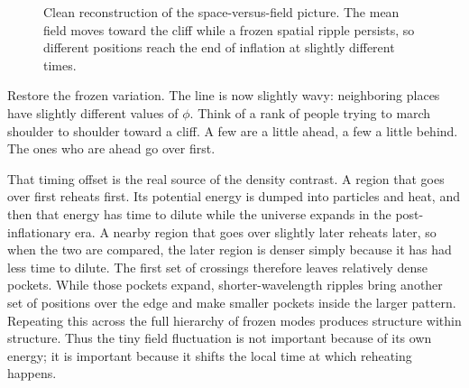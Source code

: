 \begin{figure}[htbp]
\centering
\begin{coursefitfigure}
\end{coursefitfigure}
\caption{Clean reconstruction of the space-versus-field picture. The mean field moves toward the cliff while a frozen spatial ripple persists, so different positions reach the end of inflation at slightly different times.}
\label{fig:c10-cliff-reconstruction}
\end{figure}

Restore the frozen variation. The line is now slightly wavy: neighboring places have slightly different values of \(\phi\). Think of a rank of people trying to march shoulder to shoulder toward a cliff. A few are a little ahead, a few a little behind. The ones who are ahead go over first.

That timing offset is the real source of the density contrast. A region that goes over first reheats first. Its potential energy is dumped into particles and heat, and then that energy has time to dilute while the universe expands in the post-inflationary era. A nearby region that goes over slightly later reheats later, so when the two are compared, the later region is denser simply because it has had less time to dilute. The first set of crossings therefore leaves relatively dense pockets. While those pockets expand, shorter-wavelength ripples bring another set of positions over the edge and make smaller pockets inside the larger pattern. Repeating this across the full hierarchy of frozen modes produces structure within structure. Thus the tiny field fluctuation is not important because of its own energy; it is important because it shifts the local time at which reheating happens.


